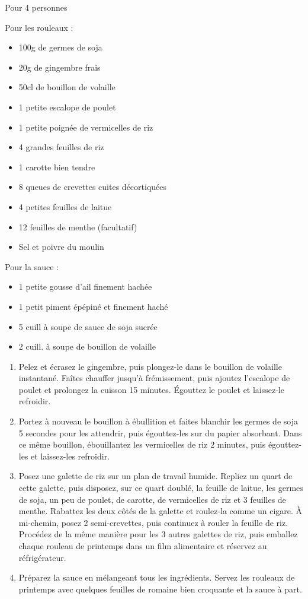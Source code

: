 \bigskip
{}
{Pour 4 personnes}{Pour les rouleaux : \begin{itemize}
	\item 100g de germes de soja
	\item 20g de gingembre frais
	\item 50cl de bouillon de volaille
	\item 1 petite escalope de poulet
	\item 1 petite poignée de vermicelles de riz
	\item 4 grandes feuilles de riz
	\item 1 carotte bien tendre
	\item 8 queues de crevettes cuites décortiquées
	\item 4 petites feuilles de laitue
	\item 12 feuilles de menthe (facultatif)
	\item Sel et poivre du moulin
\end{itemize}
Pour la sauce : \begin{itemize}
	\item 1 petite gousse d'ail finement hachée
	\item 1 petit piment épépiné et finement haché
	\item 5 cuill à soupe de sauce de soja sucrée
	\item 2 cuill. à soupe de bouillon de volaille
\end{itemize}}
{\phantom{.}

\bigskip
\begin{enumerate}
	\item Pelez et écrasez le gingembre, puis plongez-le dans le bouillon de volaille instantané. Faîtes chauffer jusqu'à frémissement, puis ajoutez l'escalope de poulet et prolongez la cuisson 15 minutes. Égouttez le poulet et laissez-le refroidir.
	\item Portez à nouveau le bouillon à ébullition et faites blanchir les germes de soja 5 secondes pour les attendrir, puis égouttez-les sur du papier absorbant. Dans ce même bouillon, ébouillantez les vermicelles de riz 2 minutes, puis égouttez-les et laissez-les refroidir.
	\item Posez une galette de riz sur un plan de travail humide. Repliez un quart de cette galette, puis disposez, sur ce quart doublé, la feuille de laitue, les germes de soja, un peu de poulet, de carotte, de vermicelles de riz et 3 feuilles de menthe. Rabattez les deux côtés de la galette et roulez-la comme un cigare. À mi-chemin, posez 2 semi-crevettes, puis continuez à rouler la feuille de riz. Procédez de la même manière pour les 3 autres galettes de riz, puis emballez chaque rouleau de printemps dans un film alimentaire et réservez au réfrigérateur. 
	\item Préparez la sauce en mélangeant tous les ingrédients. Servez les rouleaux de printemps avec quelques feuilles de romaine bien croquante et la sauce à part.
\end{enumerate}

\medskip
\phantom{.}}

